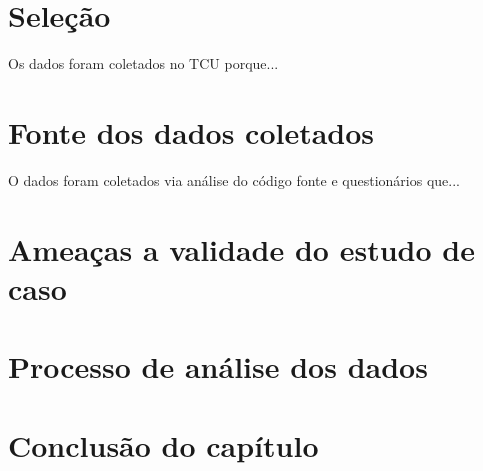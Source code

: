 \section{Seleção}

Os dados foram coletados no TCU porque...

\section{Fonte dos dados coletados}

O dados foram coletados via análise do código fonte e questionários que...

\section{Ameaças a validade do estudo de caso}

\section{Processo de análise dos dados}

\section{Conclusão do capítulo}

\label{estudo de caso}

